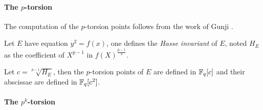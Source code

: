 \paragraph{The $p$-torsion}
The computation of the $p$-torsion points follows from the work of
Gunji \cite{Gun76}. 

\begin{definition}
  \label{def:hasse}
  Let $E$ have equation $y^2 = f(x)$, one defines the \emph{Hasse
    invariant} of $E$, noted $H_E$ as the coefficient of $X^{p-1}$ in
  $f(X)^{\frac{p-1}{2}}$.
\end{definition}

\begin{proposition}
  Let $c=\sqrt[p-1]{H_E}$, then the $p$-torsion points of $E$ are
  defined in $\mathbb{F}_q[c]$ and their abscissae are defined in $\mathbb{F}_q[c^2]$.
\end{proposition}


\paragraph{The $p^k$-torsion}


%
